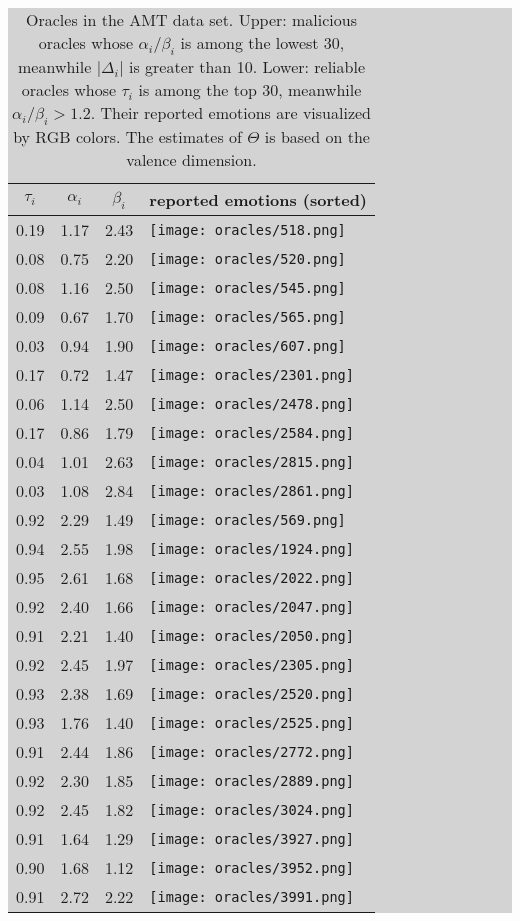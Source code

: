 \documentclass[10pt,journal,letterpaper,compsoc,twoside]{IEEEtran}
\begin{document}
\begin{table*}[ht!]
\centering
\colorbox{lightgray}{%
\begin{tabular}{ccc|l}
$\tau_i$ & $\alpha_i$ & $\beta_i$ & reported emotions (sorted)\\\hline\hline
0.19 &1.17&2.43    & \texttt{[image: oracles/518.png]}\\
0.08 & 0.75 & 2.20 & \texttt{[image: oracles/520.png]}\\
0.08 & 1.16 & 2.50 & \texttt{[image: oracles/545.png]}\\
0.09 & 0.67 & 1.70 & \texttt{[image: oracles/565.png]}\\
0.03 & 0.94 & 1.90 & \texttt{[image: oracles/607.png]}\\
0.17 & 0.72 & 1.47 & \texttt{[image: oracles/2301.png]}\\
0.06 & 1.14 & 2.50 & \texttt{[image: oracles/2478.png]}\\
0.17 & 0.86 & 1.79 & \texttt{[image: oracles/2584.png]}\\
0.04 & 1.01 & 2.63 & \texttt{[image: oracles/2815.png]}\\
0.03 & 1.08 & 2.84 & \texttt{[image: oracles/2861.png]}\\\hline\hline
0.92 & 2.29 & 1.49 & \texttt{[image: oracles/569.png]}\\
0.94 & 2.55 & 1.98 & \texttt{[image: oracles/1924.png]}\\
0.95 & 2.61 & 1.68 & \texttt{[image: oracles/2022.png]}\\
0.92 & 2.40 & 1.66 & \texttt{[image: oracles/2047.png]}\\
0.91 & 2.21 & 1.40 & \texttt{[image: oracles/2050.png]}\\
0.92 & 2.45 & 1.97 & \texttt{[image: oracles/2305.png]}\\
0.93 & 2.38 & 1.69 & \texttt{[image: oracles/2520.png]}\\
0.93 & 1.76 & 1.40 & \texttt{[image: oracles/2525.png]}\\
0.91 & 2.44 & 1.86 & \texttt{[image: oracles/2772.png]}\\
0.92 & 2.30 & 1.85 & \texttt{[image: oracles/2889.png]}\\
0.92 & 2.45 & 1.82 & \texttt{[image: oracles/3024.png]}\\
0.91 & 1.64 & 1.29 & \texttt{[image: oracles/3927.png]}\\
0.90 & 1.68 & 1.12 & \texttt{[image: oracles/3952.png]}\\
0.91 & 2.72 & 2.22 & \texttt{[image: oracles/3991.png]}
\end{tabular}
}\caption{Oracles in the AMT data set. 
Upper: malicious oracles whose ${\alpha_i}/{\beta_i}$ is among
the lowest 30, meanwhile $|\Delta_i|$ is greater than 10. 
Lower: reliable oracles whose $\tau_i$ is among the top 30, meanwhile ${\alpha_i}/{\beta_i}>1.2$.
Their reported emotions are visualized by RGB colors. 
The estimates of $\Theta$ is based on the valence dimension.}
\label{fig:visual}
\end{table*}
\end{document}
